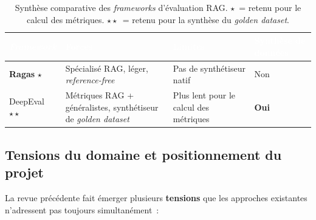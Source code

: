 \documentclass[11pt,a4paper]{article}
\begin{document}
\begin{table}[H]
\centering
\small
\begin{tabularx}{\linewidth}{L{2.5cm} L{3.5cm} L{3.5cm} C{3cm}}
\toprule
{}
\textcolor{white}{\textbf{\textit{Framework}}} &
\textcolor{white}{\textbf{Forces}} &
\textcolor{white}{\textbf{Limites}} &
\textcolor{white}{\textbf{Synthèse de données}} \\
\midrule
{}
\textbf{Ragas} $\star$  & Spécialisé RAG, léger, \textit{reference-free}   & Pas de synthétiseur natif        & Non \\
DeepEval $\star\star$ & Métriques RAG + généralistes, synthétiseur de \textit{golden dataset} & Plus lent pour le calcul des métriques & \textbf{Oui} \\
\bottomrule
\end{tabularx}
\caption{Synthèse comparative des \textit{frameworks} d'évaluation RAG. $\star$~= retenu pour le calcul des métriques. $\star\star$~= retenu pour la synthèse du \textit{golden dataset}.}
\label{tab:eval}
\end{table}

\subsection{Tensions du domaine et positionnement du projet}
\label{sec:tensions}

La revue précédente fait émerger plusieurs \textbf{tensions} que les approches existantes n'adressent pas toujours simultanément~:
\end{document}
